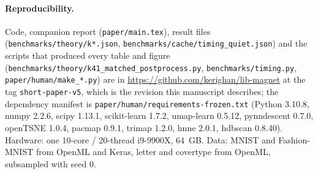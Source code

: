 \documentclass[10pt,twocolumn]{article}
\begin{document}
\paragraph{Reproducibility.} Code, companion report (\texttt{paper/main.tex}), result files
(\texttt{benchmarks/theory/k*.json}, \texttt{benchmarks/cache/timing\_quiet.json}) and the scripts that produced
every table and figure (\texttt{benchmarks/theory/k41\_matched\_postprocess.py}, \texttt{benchmarks/timing.py},
\texttt{paper/human/make\_*.py}) are in \url{https://github.com/kerighan/lib-magnet} at the tag
\texttt{short-paper-v5}, which is the revision this manuscript describes; the dependency manifest is
\texttt{paper/human/requirements-frozen.txt} (Python 3.10.8, numpy 2.2.6, scipy 1.13.1, scikit-learn 1.7.2,
umap-learn 0.5.12, pynndescent 0.7.0, openTSNE 1.0.4, pacmap 0.9.1, trimap 1.2.0, hnne 2.0.1, hdbscan 0.8.40).
Hardware: one 10-core / 20-thread i9-9900X, 64~GB. Data: MNIST and Fashion-MNIST from OpenML and
Keras, letter and covertype from OpenML, subsampled with seed 0.
\end{document}
